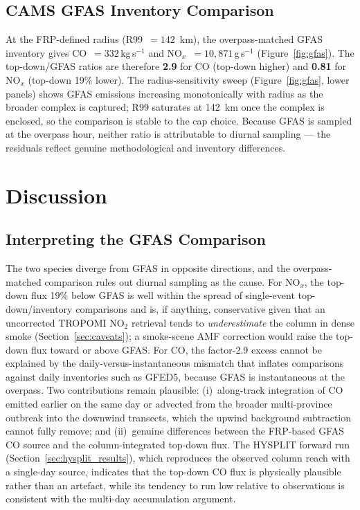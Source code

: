 \documentclass[draft]{agujournal2019}
\newcommand{\NOx}{NO$_x$}
\newcommand{\NOtwo}{NO$_2$}
\newcommand{\kgs}{\,kg\,s$^{-1}$}
\newcommand{\gs}{\,g\,s$^{-1}$}
\begin{document}
\subsection{CAMS GFAS Inventory Comparison}
\label{sec:gfas}

At the FRP-defined radius (R99~$=142$~km), the overpass-matched GFAS inventory gives CO~$=332$\kgs{} and \NOx{}~$=10{,}871$\gs{} (Figure~\ref{fig:gfas}). The top-down/GFAS ratios are therefore \textbf{2.9} for CO (top-down higher) and \textbf{0.81} for \NOx{} (top-down 19\% lower). The radius-sensitivity sweep (Figure~\ref{fig:gfas}, lower panels) shows GFAS emissions increasing monotonically with radius as the broader complex is captured; R99 saturates at 142~km once the complex is enclosed, so the comparison is stable to the cap choice. Because GFAS is sampled at the overpass hour, neither ratio is attributable to diurnal sampling --- the residuals reflect genuine methodological and inventory differences.

\section{Discussion}
\label{sec:discussion}

\subsection{Interpreting the GFAS Comparison}
\label{sec:interpret}

The two species diverge from GFAS in opposite directions, and the overpass-matched comparison rules out diurnal sampling as the cause. For \NOx{}, the top-down flux 19\% below GFAS is well within the spread of single-event top-down/inventory comparisons \citep{Mebust2011, Jin2021} and is, if anything, conservative given that an uncorrected TROPOMI \NOtwo{} retrieval tends to \emph{underestimate} the column in dense smoke (Section~\ref{sec:caveats}); a smoke-scene AMF correction would raise the top-down flux toward or above GFAS. For CO, the factor-2.9 excess cannot be explained by the daily-versus-instantaneous mismatch that inflates comparisons against daily inventories such as GFED5, because GFAS is instantaneous at the overpass. Two contributions remain plausible: (i)~along-track integration of CO emitted earlier on the same day or advected from the broader multi-province outbreak into the downwind transects, which the upwind background subtraction cannot fully remove; and (ii)~genuine differences between the FRP-based GFAS CO source and the column-integrated top-down flux. The HYSPLIT forward run (Section~\ref{sec:hysplit_results}), which reproduces the observed column reach with a single-day source, indicates that the top-down CO flux is physically plausible rather than an artefact, while its tendency to run low relative to observations is consistent with the multi-day accumulation argument.
\end{document}
